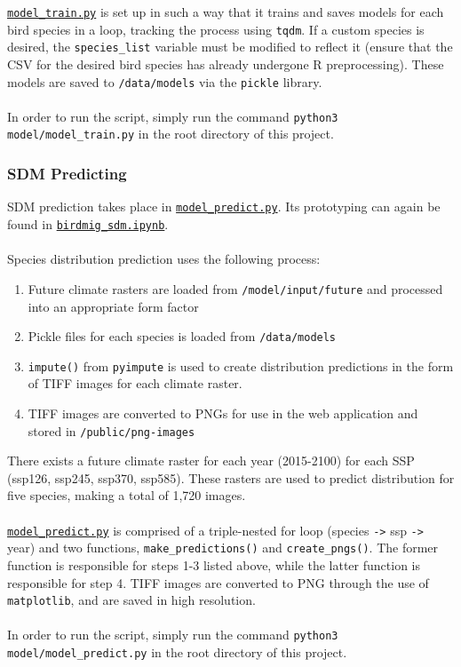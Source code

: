 \documentclass{article}
\begin{document}
\noindent \texttt{\href{run:../model/model\_train.py}{model\_train.py}} is set up in such a way that it trains and saves models for each bird species in a loop, tracking the process using \texttt{tqdm}. If a custom species is desired, the \texttt{species\_list} variable must be modified to reflect it (ensure that the CSV for the desired bird species has already undergone R preprocessing). These models are saved to \texttt{/data/models} via the \texttt{pickle} library.
\\\\
In order to run the script, simply run the command \texttt{python3 model/model\_train.py} in the root directory of this project.

\subsubsection{SDM Predicting}

SDM prediction takes place in \texttt{\href{run:../model/model\_predict.py}{model\_predict.py}}. Its prototyping can again be found in \texttt{\href{run:../model/birdmig\_sdm.ipynb}{birdmig\_sdm.ipynb}}.
\\\\
Species distribution prediction uses the following process:
\begin{enumerate}
	\item Future climate rasters are loaded from \texttt{/model/input/future} and processed into an appropriate form factor
	\item Pickle files for each species is loaded from \texttt{/data/models}
	\item \texttt{impute()} from \texttt{pyimpute} is used to create distribution predictions in the form of TIFF images for each climate raster.
	\item TIFF images are converted to PNGs for use in the web application and stored in \texttt{/public/png-images}
\end{enumerate}

\noindent There exists a future climate raster for each year (2015-2100) for each SSP (ssp126, ssp245, ssp370, ssp585). These rasters are used to predict distribution for five species, making a total of 1,720 images.
\\\\
\texttt{\href{run:../model/model\_predict.py}{model\_predict.py}} is comprised of a triple-nested for loop (species \verb|->| ssp \verb|->| year) and two functions, \texttt{make\_predictions()} and \texttt{create\_pngs()}. The former function is responsible for steps 1-3 listed above, while the latter function is responsible for step 4. TIFF images are converted to PNG through the use of \texttt{matplotlib}, and are saved in high resolution.
\\\\
In order to run the script, simply run the command \texttt{python3 model/model\_predict.py} in the root directory of this project.
\end{document}
